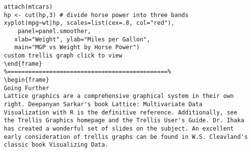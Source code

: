 \begin{frame}[fragile]
\begin{framed}
\begin{verbatim}
attach(mtcars)
hp <- cut(hp,3) # divide horse power into three bands 
xyplot(mpg~wt|hp, scales=list(cex=.8, col="red"),
  	panel=panel.smoother,
   xlab="Weight", ylab="Miles per Gallon", 
   main="MGP vs Weight by Horse Power")
custom trellis graph click to view
\end{frame}
%==============================================%
\begin{frame}
Going Further
Lattice graphics are a comprehensive graphical system in their own right. Deepanyan Sarkar's book Lattice: Multivariate Data Visualization with R is the definitive reference. Additionally, see the Trellis Graphics homepage and the Trellis User's Guide. Dr. Ihaka has created a wonderful set of slides on the subject. An excellent early consideration of trellis graphs can be found in W.S. Cleavland's classic book Visualizing Data.
\end{verbatim}
\end{framed}
\end{frame}


